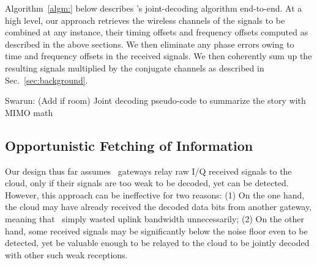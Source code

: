  \vspace*{0.1in}

 Algorithm~\ref{algm:} below describes \name's joint-decoding algorithm end-to-end. At a high level, our approach retrieves the wireless channels of the signals to be combined at any instance, their timing offsets and frequency offsets computed as described in the above sections. We then eliminate any phase errors owing to time and frequency offsets in the received signals. We then coherently sum up the resulting signals multiplied by the conjugate channels as described in Sec.~\ref{sec:background}. 

{\color{red} Swarun: (Add if room) Joint decoding pseudo-code to summarize the story with MIMO math}




\subsection{Opportunistic Fetching of Information}
Our design thus far assumes \name\ gateways relay raw I/Q received signals to the cloud, only if their signals are too weak to be decoded, yet can be detected. However, this approach can be ineffective for two reasons: (1) On the one hand, the cloud may have already received the decoded data bits from another gateway, meaning that \name\ simply wasted uplink bandwidth unnecessarily; (2) On the other hand, some received signals may be significantly below the noise floor even to be detected, yet be valuable enough to be relayed to the cloud to be jointly decoded with other such weak receptions.  \vspace*{0.1in}

